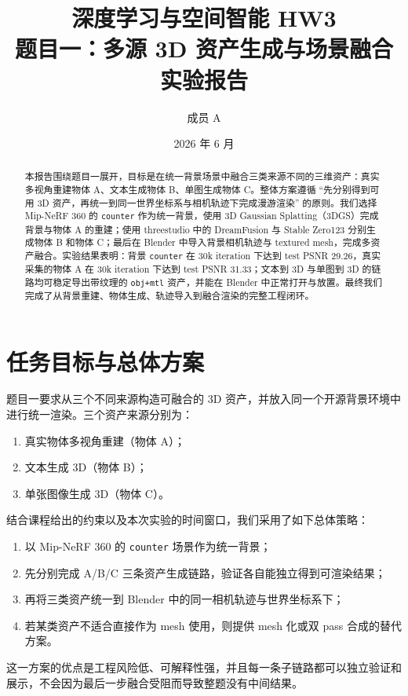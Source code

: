 \documentclass[UTF8,a4paper,11pt]{ctexart}
\title{深度学习与空间智能 HW3\\题目一：多源 3D 资产生成与场景融合实验报告}
\author{成员 A}
\date{2026 年 6 月}
\begin{document}
\maketitle

\begin{abstract}
本报告围绕题目一展开，目标是在统一背景场景中融合三类来源不同的三维资产：真实多视角重建物体 A、文本生成物体 B、单图生成物体 C。整体方案遵循 ``先分别得到可用 3D 资产，再统一到同一世界坐标系与相机轨迹下完成漫游渲染'' 的原则。我们选择 Mip-NeRF 360 的 \texttt{counter} 作为统一背景，使用 3D Gaussian Splatting（3DGS）完成背景与物体 A 的重建；使用 threestudio 中的 DreamFusion 与 Stable Zero123 分别生成物体 B 和物体 C；最后在 Blender 中导入背景相机轨迹与 textured mesh，完成多资产融合。实验结果表明：背景 \texttt{counter} 在 30k iteration 下达到 test PSNR 29.26，真实采集的物体 A 在 30k iteration 下达到 test PSNR 31.33；文本到 3D 与单图到 3D 的链路均可稳定导出带纹理的 \texttt{obj+mtl} 资产，并能在 Blender 中正常打开与放置。最终我们完成了从背景重建、物体生成、轨迹导入到融合渲染的完整工程闭环。
\end{abstract}

\section{任务目标与总体方案}

题目一要求从三个不同来源构造可融合的 3D 资产，并放入同一个开源背景环境中进行统一渲染。三个资产来源分别为：
\begin{enumerate}[itemsep=2pt]
  \item 真实物体多视角重建（物体 A）；
  \item 文本生成 3D（物体 B）；
  \item 单张图像生成 3D（物体 C）。
\end{enumerate}

结合课程给出的约束以及本次实验的时间窗口，我们采用了如下总体策略：
\begin{enumerate}[itemsep=2pt]
  \item 以 Mip-NeRF 360 的 \texttt{counter} 场景作为统一背景；
  \item 先分别完成 A/B/C 三条资产生成链路，验证各自能独立得到可渲染结果；
  \item 再将三类资产统一到 Blender 中的同一相机轨迹与世界坐标系下；
  \item 若某类资产不适合直接作为 mesh 使用，则提供 mesh 化或双 pass 合成的替代方案。
\end{enumerate}

这一方案的优点是工程风险低、可解释性强，并且每一条子链路都可以独立验证和展示，不会因为最后一步融合受阻而导致整题没有中间结果。
\end{document}
